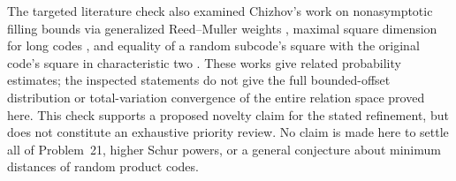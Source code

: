 The targeted literature check also examined Chizhov's work on
nonasymptotic filling bounds via generalized Reed--Muller weights
\cite{Chizhov2023}, maximal square dimension for long codes
\cite{Chizhov2025}, and equality of a random subcode's square with the
original code's square in characteristic two \cite{Chizhov2026}.
These works give related probability estimates; the inspected
statements do not give the full bounded-offset distribution or
total-variation convergence of the entire relation space proved here.
This check supports a proposed novelty claim for the stated refinement,
but does not constitute an exhaustive priority review.  No claim is
made here to settle all of Problem~21, higher Schur powers, or a
general conjecture about minimum distances of random product codes.
